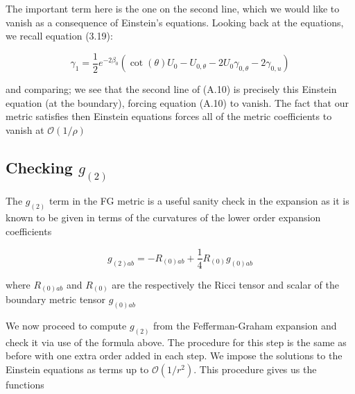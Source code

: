 \documentclass[a4paper,11pt]{article}
\numberwithin{equation}{section}
\begin{document}
\noindent The important term here is the one on the second line, which we would like to vanish as a consequence of Einstein's equations. Looking back at the equations, we recall equation (3.19):

\begin{equation}
\gamma_1=\frac{1}{2}e^{-2\beta_0}(\cot(\theta) U_0-U_{0,\theta}-2U_0 \gamma_{0,\theta}-2\gamma_{0,u})
\end{equation}

\noindent and comparing; we see that the second line of (A.10) is precisely this Einstein equation (at the boundary), forcing equation (A.10) to vanish. The fact that our metric satisfies then Einstein equations forces all of the metric coefficients to vanish at $\mathcal{O}(1/\rho)$   

\subsection{Checking $g_{(2)}$}

The $g_{(2)}$ term in the FG metric is a useful sanity check in the expansion as it is known to be given in terms of the curvatures of the lower order expansion coefficients \cite{deHaro:2000vlm}

\begin{equation} \label{eq: AdS_g_2_check}
g_{(2)ab}=-R_{(0)ab}+\frac{1}{4}R_{(0)}g_{(0)ab}
\end{equation}

\noindent where $R_{(0)ab}$ and $R_{(0)}$ are the respectively the Ricci tensor and scalar of the boundary metric tensor $g_{(0)ab}$ \par

We now proceed to compute $g_{(2)}$ from the Fefferman-Graham expansion and check it via use of the formula above. The procedure for this step is the same as before with one extra order added in each step. We impose the solutions to the Einstein equations as terms up to $\mathcal{O}(1/r^2)$. This procedure gives us the functions 
\end{document}
